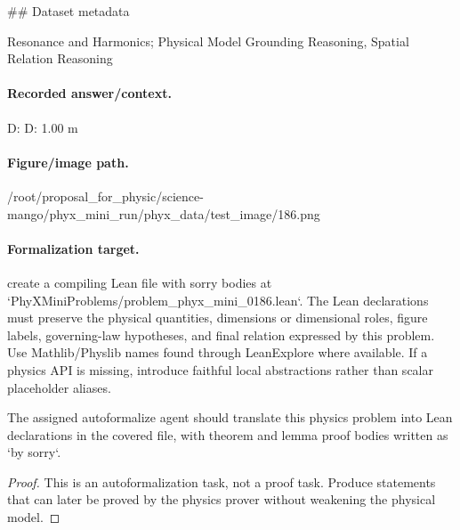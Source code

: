 \#\# Dataset metadata

Resonance and Harmonics; Physical Model Grounding Reasoning, Spatial Relation Reasoning

\paragraph{Recorded answer/context.}
D: D: 1.00 m

\paragraph{Figure/image path.}
/root/proposal\_for\_physic/science-mango/phyx\_mini\_run/phyx\_data/test\_image/186.png

\paragraph{Formalization target.}
create a compiling Lean file with sorry bodies at `PhyXMiniProblems/problem\_phyx\_mini\_0186.lean`. The Lean declarations must preserve the physical quantities, dimensions or dimensional roles, figure labels, governing-law hypotheses, and final relation expressed by this problem.
Use Mathlib/Physlib names found through LeanExplore where available. If a physics API is missing, introduce faithful local abstractions rather than scalar placeholder aliases.

\begin{theorem}
\label{thm:physics:phyx_mini_0186:target}
The assigned autoformalize agent should translate this physics problem into Lean declarations in the covered file, with theorem and lemma proof bodies written as `by sorry`.
\end{theorem}
\begin{proof}
This is an autoformalization task, not a proof task. Produce statements that can later be proved by the physics prover without weakening the physical model.
\end{proof}


